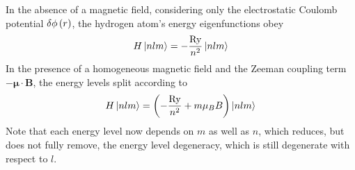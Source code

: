 \documentclass[11pt, a4paper]{article}
\renewcommand{\vec}[1]{\bm{#1}}  %
\newcommand{\B}{\vec{B}}  %
\newcommand{\m}{\vec{\mu}}  %
\begin{document}
\begin{itemize}
	In the absence of a magnetic field, considering only the electrostatic Coulomb potential $ \var{\phi}(r) $, the hydrogen atom's energy eigenfunctions obey
	\begin{equation*}
		H \ket{nlm} = - \frac{\si{Ry}}{n^{2}}\ket{nlm}
	\end{equation*}
	In the presence of a homogeneous magnetic field and the Zeeman coupling term $ - \m \cdot \B $, the energy levels split according to
	\begin{equation*}
		H \ket{nlm} = \left(- \frac{\si{Ry}}{n^{2}} + m \mu_{B}B\right)\ket{nlm}
	\end{equation*}
	Note that each energy level now depends on $ m $ as well as $ n $, which reduces, but does not fully remove, the energy level degeneracy, which is still degenerate with respect to $ l $. 
	
	\end{itemize}
\end{document}
